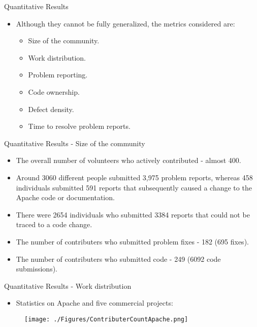 \documentclass{beamer}
\begin{document}
\begin{frame}{Quantitative Results}
\begin{itemize}
	\item Although they cannot be fully generalized, the metrics considered are:\pause
	\begin{itemize}
		\item Size of the community. \pause
		\item Work distribution. \pause
		\item Problem reporting. \pause
		\item Code ownership. \pause
		\item Defect density. \pause
		\item Time to resolve problem reports. 
	\end{itemize}
\end{itemize}
\end{frame}

\begin{frame}{Quantitative Results - Size of the community}
\begin{itemize}
	\item The overall number of volunteers who actively contributed - almost 400. \pause
	\item Around 3060 different people submitted 3,975 problem reports, whereas 458 individuals submitted 591 reports that subsequently caused a change to the Apache code or documentation. \pause
	\item There were 2654 individuals who submitted 3384 reports that could not be traced to a code change.\pause
	\item The number of contributers who submitted problem fixes - 182 (695 fixes). \pause
	\item The number of contributers who submitted code - 249 (6092 code submissions). \pause
\end{itemize}
\end{frame}

\begin{frame}{Quantitative Results - Work distribution}
\begin{itemize}
	\item Statistics on Apache and five commercial projects: 
\end{itemize}
\begin{figure}
	\texttt{[image: ./Figures/ContributerCountApache.png]}
\end{figure}
\end{frame}
\end{document}
